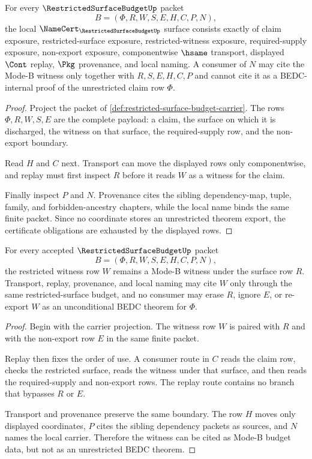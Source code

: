 \begin{theorem}
\label{thm:restricted-surface-budget-namecert-obligations}
For every $\RestrictedSurfaceBudgetUp$ packet
$$
B=(\Phi,R,W,S,E,H,C,P,N),
$$
the local $\NameCert_{\RestrictedSurfaceBudgetUp}$ surface consists exactly of
claim exposure, restricted-surface exposure, restricted-witness exposure,
required-supply exposure, non-export exposure, componentwise $\hsame$
transport, displayed $\Cont$ replay, $\Pkg$ provenance, and local naming. A
consumer of $N$ may cite the Mode-B witness only together with $R,S,E,H,C,P$
and cannot cite it as a BEDC-internal proof of the unrestricted claim row
$\Phi$.
\end{theorem}
\begin{proof}
Project the packet of \autoref{def:restricted-surface-budget-carrier}. The
rows $\Phi,R,W,S,E$ are the complete payload: a claim, the surface on which it
is discharged, the witness on that surface, the required-supply row, and the
non-export boundary.

Read $H$ and $C$ next. Transport can move the displayed rows only
componentwise, and replay must first inspect $R$ before it reads $W$ as a
witness for the claim.

Finally inspect $P$ and $N$. Provenance cites the sibling dependency-map,
tuple, family, and forbidden-ancestry chapters, while the local name binds the
same finite packet. Since no coordinate stores an unrestricted theorem export,
the certificate obligations are exhausted by the displayed rows.
\end{proof}

\begin{theorem}
\label{thm:restricted-surface-budget-modeb-nonescape}
For every accepted $\RestrictedSurfaceBudgetUp$ packet
$$
B=(\Phi,R,W,S,E,H,C,P,N),
$$
the restricted witness row $W$ remains a Mode-B witness under the surface row
$R$. Transport, replay, provenance, and local naming may cite $W$ only through
the same restricted-surface budget, and no consumer may erase $R$, ignore
$E$, or re-export $W$ as an unconditional BEDC theorem for $\Phi$.
\end{theorem}
\begin{proof}
Begin with the carrier projection. The witness row $W$ is paired with $R$ and
with the non-export row $E$ in the same finite packet.

Replay then fixes the order of use. A consumer route in $C$ reads the claim
row, checks the restricted surface, reads the witness under that surface, and
then reads the required-supply and non-export rows. The replay route contains
no branch that bypasses $R$ or $E$.

Transport and provenance preserve the same boundary. The row $H$ moves only
displayed coordinates, $P$ cites the sibling dependency packets as sources,
and $N$ names the local carrier. Therefore the witness can be cited as Mode-B
budget data, but not as an unrestricted BEDC theorem.
\end{proof}

